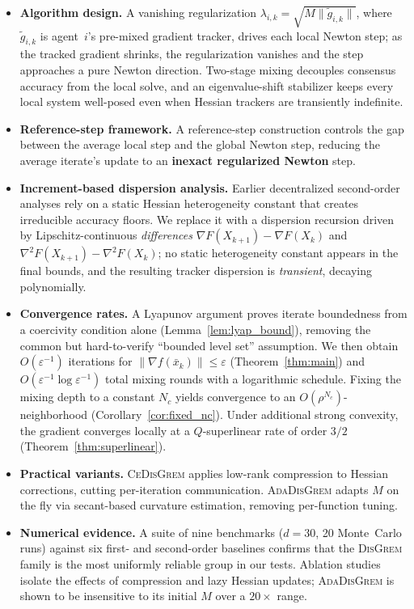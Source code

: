 \documentclass[10pt,twocolumn,letterpaper]{article}
\def\cO{O}%
\theoremstyle{compact}
\theoremstyle{compactremark}
\newcommand{\cO}{\mathcal{O}}
\begin{document}
\begin{itemize}[leftmargin=1.2em,itemsep=2pt]
	\item \textbf{Algorithm design.}
	A vanishing regularization
	$\lambda_{i,k}=\sqrt{M\|\tilde g_{i,k}\|}$, where
	$\tilde g_{i,k}$ is agent~$i$'s pre-mixed gradient tracker,
	drives each local Newton step; as the tracked gradient shrinks,
	the regularization vanishes and the step approaches a pure
	Newton direction.
	Two-stage mixing decouples consensus accuracy from the local
	solve, and an eigenvalue-shift stabilizer keeps every local
	system well-posed even when Hessian trackers are transiently
	indefinite.
	
	\item \textbf{Reference-step framework.}
	A reference-step construction controls the gap between the
	average local step and the global Newton step, reducing the
	average iterate's update to an \textbf{inexact regularized Newton} step.
	
	\item \textbf{Increment-based dispersion analysis.}
	Earlier decentralized second-order analyses rely on a static
	Hessian heterogeneity constant that creates irreducible accuracy
	floors.
	We replace it with a dispersion recursion driven by
	Lipschitz-continuous \emph{differences}
	$\nabla F(X_{k+1}){-}\nabla F(X_k)$ and
	$\nabla^2 F(X_{k+1}){-}\nabla^2 F(X_k)$; no static
	heterogeneity constant appears in the final bounds, and
	the resulting tracker dispersion is \emph{transient},
	decaying polynomially.
	
	\item \textbf{Convergence rates.}
	A Lyapunov argument proves iterate boundedness from a coercivity
	condition alone (Lemma~\ref{lem:lyap_bound}), removing the
	common but hard-to-verify ``bounded level set'' assumption.
	We then obtain
	$\cO(\varepsilon^{-1})$ iterations for
	$\|\nabla f(\bar x_k)\|\le\varepsilon$
	(Theorem~\ref{thm:main})
	and $\cO(\varepsilon^{-1}\log\varepsilon^{-1})$ total mixing
	rounds with a logarithmic schedule.
	Fixing the mixing depth to a constant $N_c$ yields convergence
	to an $\cO(\rho^{N_c})$-neighborhood
	(Corollary~\ref{cor:fixed_nc}).
	Under additional strong convexity, the gradient converges
	locally at a $Q$-superlinear rate of order $3/2$
	(Theorem~\ref{thm:superlinear}).
	
	\item \textbf{Practical variants.}
	\textsc{CeDisGrem} applies low-rank compression to Hessian
	corrections, cutting per-iteration communication.
	\textsc{AdaDisGrem} adapts $M$ on the fly via secant-based
	curvature estimation, removing per-function tuning.
	
	\item \textbf{Numerical evidence.}
	A suite of nine benchmarks ($d{=}30$, 20 Monte~Carlo runs)
	against six first- and second-order baselines confirms that
	the \textsc{DisGrem} family is the most uniformly reliable
	group in our tests.
	Ablation studies isolate the effects of compression and lazy
	Hessian updates; \textsc{AdaDisGrem} is shown to be
	insensitive to its initial $M$ over a $20\times$ range.
\end{itemize}
\end{document}
